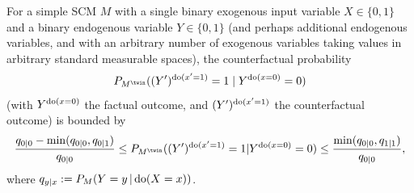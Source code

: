 \begin{Prp}\label{prp:Bounding_counterfactuals}
  For a simple SCM $M$ with a single binary exogenous input variable $X \in \{0,1\}$ and a binary endogenous variable $Y \in \{0,1\}$
  (and perhaps additional endogenous variables, and with an arbitrary number of exogenous variables taking values in arbitrary
  standard measurable spaces), the counterfactual probability
  $$P_{M^{\twin}}((Y')^{\doit(x'=1)}=1\mid Y^{\doit(x=0)}=0)$$
  (with $Y^{\operatorname{do}(x=0)}$ the factual outcome, and $(Y')^{\operatorname{do}(x'=1)}$ the counterfactual outcome)
  is bounded by
$$\frac{q_{0|0} - \min(q_{0|0},q_{0|1})}{q_{0|0}} \le P_{M^\twin}((Y')^{\doit(x'=1)} = 1 | Y^{\doit(x=0)}=0) \le \frac{\min(q_{0|0},q_{1|1})}{q_{0|0}},$$
  where
  $q_{y|x} := P_M(Y=y\operatorname*{|} \operatorname{do}(X=x))$.
\end{Prp}

